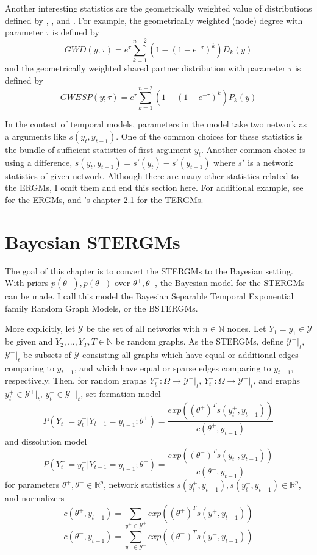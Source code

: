 \documentclass[a4paper, 11pt]{report}
\theoremstyle{definition}
\begin{document}
Another interesting statistics are the geometrically weighted value of distributions defined by
\cite{RN118}, \cite{RN104}, \cite{RN128} and \cite{RN103}.
For example, the geometrically weighted (node) degree with parameter $\tau$ is defined by
\[GWD(y;\tau)=e^{\tau} \sum_{k=1}^{n-2} (1-(1-e^{-\tau})^k)D_k(y)\]
and the geometrically weighted shared partner distribution with parameter $\tau$ is defined by
\[GWESP(y;\tau)=e^{\tau} \sum_{k=1}^{n-2} (1-(1-e^{-\tau})^k)P_k(y)\]


In the context of temporal models, parameters in the model take two network as a arguments like $s(y_t,y_{t-1})$.
One of the common choices for these statistics is the bundle of sufficient statistics of first argument $y_t$.
Another common choice is using a difference, $s(y_t,y_{t-1})=s'(y_t)-s'(y_{t-1})$ where $s'$ is a network statistics of given network.
Although there are many other statistics related to the ERGMs, I omit them and end this section here.
For additional example, see \cite{RN107} for the ERGMs, and \cite{RN125}'s chapter 2.1 for the TERGMs.




\chapter{Bayesian STERGMs} \label{Cahpter3}

The goal of this chapter is to convert the STERGMs to the Bayesian setting.
With priors $p(\theta^+),p(\theta^-)$ over $\theta^+,\theta^-$,
the Bayesian model for the STERGMs can be made. I call this model the Bayesian Separable Temporal Exponential family Random Graph Models,
or the BSTERGMs. 

More explicitly, let $\mathcal{Y}$ be the set of all networks with $n\in \mathbb{N}$ nodes. Let $Y_1=y_1 \in \mathcal{Y}$ be given and $Y_2,...,Y_T, T\in\mathbb{N}$ be random graphs.
As the STERGMs, define $\mathcal{Y}^+|_t$, $\mathcal{Y}^-|_t$ be subsets of $\mathcal{Y}$ consisting all graphs which have equal or additional edges comparing to $y_{t-1}$,
and which have equal or sparse edges comparing to $y_{t-1}$, respectively.
Then, for random graphs $Y_t^+: \Omega \to \mathcal{Y}^+|_t$, $Y_t^-: \Omega \to \mathcal{Y}^-|_t$,
and graphs $y_t^+ \in \mathcal{Y}^+|_t$, $y_t^- \in \mathcal{Y}^-|_t$, set formation model
\[P(Y_t^+=y_t^+|Y_{t-1}=y_{t-1};\theta^+) = \frac{exp((\theta^+)^{T}s(y_t^+, y_{t-1}))}{c(\theta^+, y_{t-1})}\]
and dissolution model
\[P(Y_t^-=y_t^-|Y_{t-1}=y_{t-1};\theta^-) = \frac{exp((\theta^-)^{T}s(y_t^-, y_{t-1}))}{c(\theta^-, y_{t-1})}\]
for parameters $\theta^+,\theta^-\in\mathbb{R}^p$, network statistics $s(y_t^+, y_{t-1}), s(y_t^-, y_{t-1})\in\mathbb{R}^p$,
and normalizers 
\[c(\theta^+, y_{t-1})=\sum_{y^+\in\mathcal{Y}^+}exp((\theta^+)^{T}s(y^+, y_{t-1}))\]
\[c(\theta^-, y_{t-1})=\sum_{y^-\in\mathcal{Y}^-}exp((\theta^-)^{T}s(y^-, y_{t-1}))\]
\end{document}
